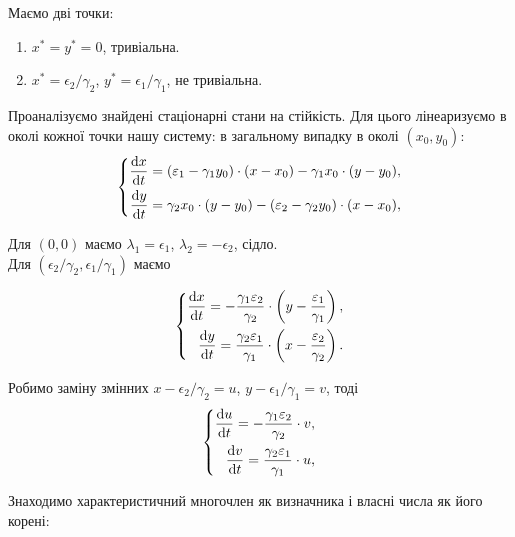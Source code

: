 Маємо дві точки:
\begin{enumerate}
    \item $x^* = y^* = 0$, тривіальна.
    \item $x^* = \epsilon_2 / \gamma_2$, $y^* = \epsilon_1 / \gamma_1$, не тривіальна.
\end{enumerate}

Проаналізуємо знайдені стаціонарні стани на стійкість. Для цього лінеаризуємо в околі кожної точки нашу систему: в загальному випадку в околі $(x_0, y_0)$:
\begin{equation}
    \left\{
    \begin{aligned}
    \frac{\mathop{}\!\mathrm{d} x}{\mathop{}\!\mathrm{d} t} = (\varepsilon_1 - \gamma_1 y_0) \cdot (x - x_0) - \gamma_1  x_0 \cdot (y - y_0), \\
    \frac{\mathop{}\!\mathrm{d} y}{\mathop{}\!\mathrm{d} t} = \gamma_2  x_0 \cdot (y - y_0) - (\varepsilon_2 - \gamma_2 y_0) \cdot (x - x_0),
\end{aligned}
\right.
\end{equation}

Для $(0,0)$ маємо $\lambda_1 = \epsilon_1$, $\lambda_2 = - \epsilon_2$, сідло. \\

Для $(\epsilon_2 / \gamma_2, \epsilon_1 / \gamma_1)$ маємо 

\begin{equation}
    \left\{
    \begin{aligned}
    \frac{\mathop{}\!\mathrm{d} x}{\mathop{}\!\mathrm{d} t} = - \frac{\gamma_1 \varepsilon_2}{\gamma_2} \cdot \left(y - \frac{\varepsilon_1}{\gamma_1} \right), \\
    \frac{\mathop{}\!\mathrm{d} y}{\mathop{}\!\mathrm{d} t} = \frac{\gamma_2 \varepsilon_1}{\gamma_1} \cdot \left(x - \frac{\varepsilon_2}{\gamma_2} \right).
\end{aligned}
\right.
\end{equation}

Робимо заміну змінних $x - \epsilon_2 / \gamma_2 = u$, $y - \epsilon_1 / \gamma_1 = v$, тоді
\begin{equation}
    \left\{
    \begin{aligned}
    \frac{\mathop{}\!\mathrm{d} u}{\mathop{}\!\mathrm{d} t} = - \frac{\gamma_1 \varepsilon_2}{\gamma_2} \cdot v, \\
    \frac{\mathop{}\!\mathrm{d} v}{\mathop{}\!\mathrm{d} t} = \frac{\gamma_2 \varepsilon_1}{\gamma_1} \cdot u,
\end{aligned}
\right.
\end{equation}

Знаходимо характеристичний многочлен як визначника і власні числа як його корені:

